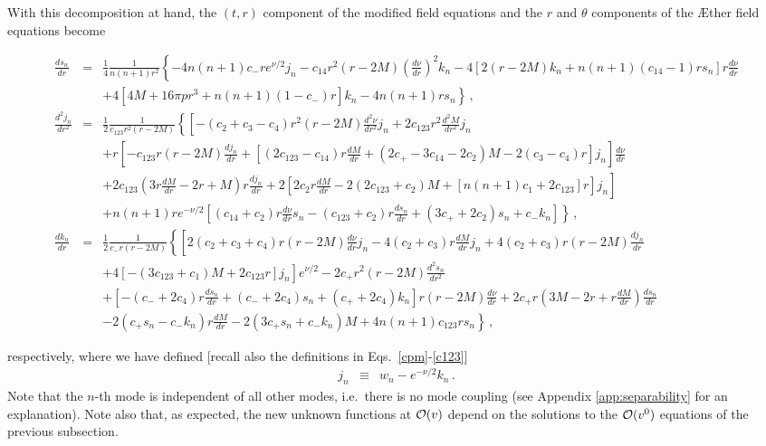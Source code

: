 \documentclass[prd,aps,twocolumn,nofootinbib,showpacs,superscriptaddress]{revtex4-1}
\newcommand\ba{\begin{eqnarray}}
\newcommand\ea{\end{eqnarray}}
\newcommand\bw{\begin{widetext}}
\newcommand\ew{\end{widetext}}
\newcommand{\nn}{\nonumber}
\begin{document}
With this decomposition at hand, the $(t,r)$ component of the modified
field equations and the $r$ and $\theta$ components of the \AE ther field
equations become
%
\allowdisplaybreaks \bw \ba
\label{dsdr}
\frac{ds_n}{dr} &=& \frac{1}{4} \frac{1}{n (n+1) r^2} \left\{ -4 n
(n+1) c_{-} r e^{\nu /2} j_n  - c_{14} r^2 (r-2 M) \left(
\frac{d\nu}{dr} \right)^2 k_n  -4 [ 2( r-2 M) k_n+ n (n+1) (c_{14}-1)
  r s_n] r \frac{d\nu}{dr} \right. \nn \\ & & \left. + 4 \left[ 4 M+16
  \pi p r^3 +n(n+1) (1- c_{-}) r \right] k_n-4 n (n+1) r s_n
\right\}\,, \\
%
\label{dwdrr}
\frac{d^2j_n}{dr^2} &=& \frac{1}{2} \frac{1}{c_{123} r^2(r-2 M)}
\left\{ \left[ -(c_2+c_3-c_4) r^2  (r-2 M) \frac{d^2\nu}{dr^2}  j_n +2
  c_{123} r^2\frac{d^2M}{dr^2} j_n \right. \right. \nn \\ & &
  \left. \left. +r \left[ -c_{123} r (r-2 M) \frac{dj_n}{dr} + \left[
      (2c_{123}-c_{14}) r \frac{dM}{dr} + (2 c_{+} -3c_{14} -2 c_2) M-
      2 (c_3-c_4) r  \right] j_n \right] \frac{d\nu}{dr}
  \right. \right. \nn \\ & & \left. \left. + 2 c_{123} \left( 3r
  \frac{dM}{dr} - 2 r+ M \right)  r \frac{dj_n}{dr} +2 \left[ 2 c_2 r
    \frac{dM}{dr} -2 (2 c_{123}+c_2) M+ [n (n+1) c_1 +2 c_{123}] r
    \right] j_n \right] \right. \nn \\ & & \left. + n (n+1) r
e^{-\nu/2} \left[ (c_{14}+c_2) r   \frac{d\nu}{dr} s_n - (c_{123} +
  c_2) r \frac{ds_n}{dr} + (3 c_{+}+2 c_2) s_n + c_{-} k_n \right]
\right\}\,, \\
%
\label{dkdr}
\frac{d k_n}{dr} &=& \frac{1}{2} \frac{1}{c_{-} r (r-2 M)} \left\{
\left[ 2  (c_2+c_3+c_4) r (r-2 M) \frac{d\nu}{dr} j_n-4 (c_2 + c_3) r
  \frac{dM}{dr} j_n +4 (c_2+c_3) r (r-2 M) \frac{dj_n}{dr}
  \right. \right. \nn \\ & & \left. \left. + 4 [ - (3c_{123} + c_1) M+
    2 c_{123} r] j_n \right] e^{\nu/2} -2 c_{+} r^2 (r-2 M) \frac{d^2
  s_n}{dr^2} \right. \nn \\ & & \left. + \left[- (c_{-}+2 c_4) r
  \frac{ds_n}{dr} + (c_{-}+2 c_4) s_n +  (c_{+}+2 c_4) k_n \right] r
(r-2 M) \frac{d\nu}{dr} + 2  c_{+} r \left( 3 M-2 r+r \frac{dM}{dr}
\right) \frac{ds_n}{dr} \right. \nn \\ & & \left. - 2 (c_{+} s_n -
c_{-} k_n) r \frac{dM}{dr} -2 (3c_{+} s_n+ c_{-} k_n) M+ 4 n (n+1)
c_{123} r  s_n \right\}\,, \ea \ew
%
respectively, where we have defined [recall also the definitions in Eqs.~\eqref{cpm}-\eqref{c123}]
%
\ba j_n &\equiv& w_n - e^{-\nu/2} k_n\,. \ea
%
Note that the $n$-th mode is independent of all other modes,
i.e.~there is no mode coupling (see Appendix \ref{app:separability} for an explanation).
 Note also that, as expected, the new
unknown functions at ${\cal{O}}(v)$ depend on the solutions to
the ${\cal{O}}(v^0)$ equations of the previous subsection. 
\end{document}
